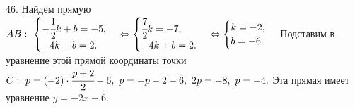 46. Найдём прямую $AB:\ \begin{cases} -\cfrac{1}{2}k+b=-5,\\ -4k+b=2.\end{cases}\Leftrightarrow\begin{cases} \cfrac{7}{2}k=-7,\\ -4k+b=2.\end{cases}
\Leftrightarrow\begin{cases} k=-2,\\ b=-6.\end{cases}$ Подставим в уравнение этой прямой координаты точки $C:\ p=(-2)\cdot\cfrac{p+2}{2}-6,\
p=-p-2-6,\ 2p=-8,\ p=-4.$ Эта прямая имеет уравнение $y=-2x-6.$\\
